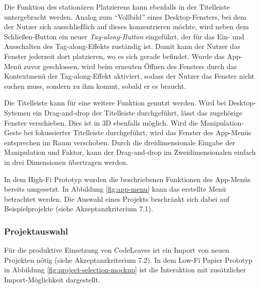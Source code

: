 Die Funktion des stationären Platzierens kann ebenfalls in der Titelleiste untergebracht werden. Analog zum "`Vollbild"' eines Desktop-Fensters, bei dem der Nutzer sich ausschließlich auf dieses konzentrieren möchte, wird neben dem Schließen-Button ein neuer \textit{Tag-along-Button} eingeführt, der für das Ein- und Ausschalten des Tag-along-Effekts zuständig ist. Damit kann der Nutzer das Fenster jederzeit dort platzieren, wo es sich gerade befindet. Wurde das App-Menü zuvor geschlossen, wird beim erneuten Öffnen des Fensters durch das Kontextmenü der Tag-along-Effekt aktiviert, sodass der Nutzer das Fenster nicht suchen muss, sondern zu ihm kommt, sobald er es braucht.

Die Titelleiste kann für eine weitere Funktion genutzt werden. Wird bei Desktop-Sytemen ein Drag-and-drop der Titelleiste durchgeführt, lässt das zugehörige Fenster verschieben. Dies ist in 3D ebenfalls möglich. Wird die Manipulation-Geste bei fokussierter Titelleiste durchgeführt, wird das Fenster des App-Menüs entsprechen im Raum verschoben. Durch die dreidimensionale Eingabe der Manipulation und Faktor, kann der Drag-and-drop im Zweidimensionalen einfach in drei Dimensionen übertragen werden.

In dem High-Fi Prototyp wurden die beschriebenen Funktionen des App-Menüs bereits umgesetzt. In Abbildung \ref{fig:app-menu} kann das erstellte Menü betrachtet werden. Die Auswahl eines Projekts beschränkt sich dabei auf Beispielprojekte (siehe Akzeptanzkriterium 7.1).

\subsubsection*{Projektauswahl}

Für die produktive Einsetzung von CodeLeaves ist ein Import von neuen Projekten nötig (siehe Akzeptanzkriterium 7.2). In dem Low-Fi Papier Prototyp in Abbildung \ref{fig:project-selection-mockup} ist die Interaktion mit zusätzlicher Import-Möglichkeit dargestellt.

